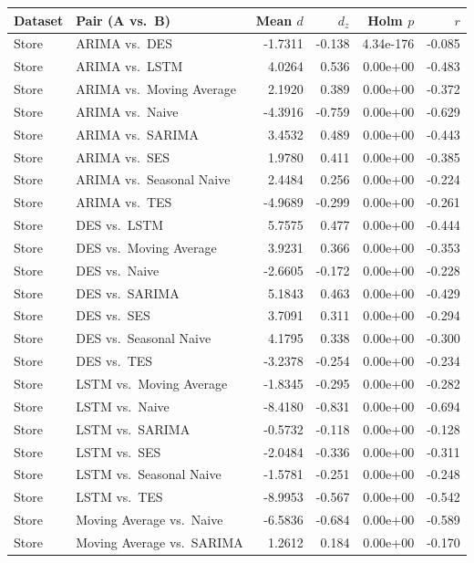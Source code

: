 {\scriptsize
\setlength\tabcolsep{4pt}
\begin{tabular}{llrrrr}
\toprule Dataset & Pair (A vs.~B) & Mean $d$ & $d_z$ & Holm $p$ & $r$ \\
\midrule
Store & ARIMA vs.~DES & -1.7311 & -0.138 & 4.34e-176 & -0.085 \\
Store & ARIMA vs.~LSTM & 4.0264 & 0.536 & 0.00e+00 & -0.483 \\
Store & ARIMA vs.~Moving Average & 2.1920 & 0.389 & 0.00e+00 & -0.372 \\
Store & ARIMA vs.~Naive & -4.3916 & -0.759 & 0.00e+00 & -0.629 \\
Store & ARIMA vs.~SARIMA & 3.4532 & 0.489 & 0.00e+00 & -0.443 \\
Store & ARIMA vs.~SES & 1.9780 & 0.411 & 0.00e+00 & -0.385 \\
Store & ARIMA vs.~Seasonal Naive & 2.4484 & 0.256 & 0.00e+00 & -0.224 \\
Store & ARIMA vs.~TES & -4.9689 & -0.299 & 0.00e+00 & -0.261 \\
Store & DES vs.~LSTM & 5.7575 & 0.477 & 0.00e+00 & -0.444 \\
Store & DES vs.~Moving Average & 3.9231 & 0.366 & 0.00e+00 & -0.353 \\
Store & DES vs.~Naive & -2.6605 & -0.172 & 0.00e+00 & -0.228 \\
Store & DES vs.~SARIMA & 5.1843 & 0.463 & 0.00e+00 & -0.429 \\
Store & DES vs.~SES & 3.7091 & 0.311 & 0.00e+00 & -0.294 \\
Store & DES vs.~Seasonal Naive & 4.1795 & 0.338 & 0.00e+00 & -0.300 \\
Store & DES vs.~TES & -3.2378 & -0.254 & 0.00e+00 & -0.234 \\
Store & LSTM vs.~Moving Average & -1.8345 & -0.295 & 0.00e+00 & -0.282 \\
Store & LSTM vs.~Naive & -8.4180 & -0.831 & 0.00e+00 & -0.694 \\
Store & LSTM vs.~SARIMA & -0.5732 & -0.118 & 0.00e+00 & -0.128 \\
Store & LSTM vs.~SES & -2.0484 & -0.336 & 0.00e+00 & -0.311 \\
Store & LSTM vs.~Seasonal Naive & -1.5781 & -0.251 & 0.00e+00 & -0.248 \\
Store & LSTM vs.~TES & -8.9953 & -0.567 & 0.00e+00 & -0.542 \\
Store & Moving Average vs.~Naive & -6.5836 & -0.684 & 0.00e+00 & -0.589 \\
Store & Moving Average vs.~SARIMA & 1.2612 & 0.184 & 0.00e+00 & -0.170 \\

\end{tabular}}
